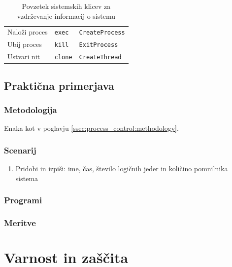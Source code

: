 \documentclass[a4paper,12pt,openright]{book}
\begin{document}
\begin{table}[h!]
\begin{center}
\begin{tabular}{ p{3cm}|p{2.9cm}|p{6.3cm} }
			Naloži proces                    & \verb|exec|                                     & \verb|CreateProcess|                                                                                               \\
			Ubij proces                       & \verb|kill|                                     & \verb|ExitProcess|                                                                                                 \\
			Ustvari nit                       & \verb|clone|                                    & \verb|CreateThread|                                                                                                \\
		\end{tabular}
	\end{center}
	\caption{Povzetek sistemskih klicev za vzdrževanje informacij o sistemu}
	\label{tab:information_maintenance}
\end{table} 

\section{Praktična primerjava}

\subsection{Metodologija}

Enaka kot v poglavju \ref{ssec:process_control:methodology}.

\subsection{Scenarij}

\begin{enumerate}
	\item Pridobi in izpiši: ime, čas, število logičnih jeder in količino pomnilnika sistema
\end{enumerate}

\subsection{Programi}

\subsection{Meritve}

\chapter{Varnost in zaščita}
\end{document}
